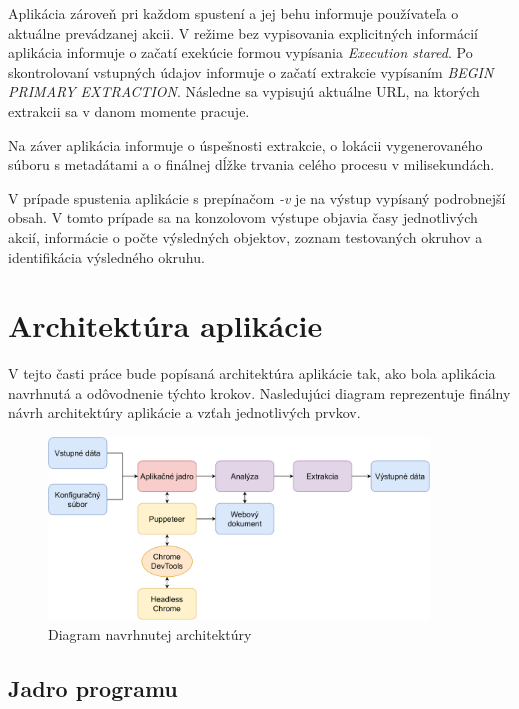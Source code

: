 Aplikácia zároveň pri každom spustení a jej behu informuje používateľa o aktuálne prevádzanej akcii. V režime bez vypisovania explicitných informácií aplikácia informuje o začatí exekúcie formou vypísania \textit{Execution stared}.  Po skontrolovaní vstupných údajov informuje o začatí extrakcie vypísaním \textit{BEGIN PRIMARY EXTRACTION}. Následne sa vypisujú aktuálne URL, na ktorých extrakcii sa v danom momente pracuje. 

Na záver aplikácia informuje o úspešnosti extrakcie, o lokácii vygenerovaného súboru s metadátami a o finálnej dĺžke trvania celého procesu v milisekundách.

V prípade spustenia aplikácie s prepínačom \textit{-v} je na výstup vypísaný podrobnejší obsah. V tomto prípade sa na konzolovom výstupe objavia časy jednotlivých akcií, informácie o počte výsledných objektov, zoznam testovaných okruhov a identifikácia výsledného okruhu.

\section{Architektúra aplikácie}

V tejto časti práce bude popísaná architektúra aplikácie tak, ako bola aplikácia navrhnutá a odôvodnenie týchto krokov. Nasledujúci diagram reprezentuje finálny návrh architektúry aplikácie a vzťah jednotlivých prvkov.

\bigskip

\begin{figure}[hbt]
	\centering
	\includegraphics[width=0.9\textwidth]{obrazky-figures/architecture.pdf}
	\caption{Diagram navrhnutej architektúry}
	\label{architecture}
\end{figure}

\bigskip

\subsection{Jadro programu}

